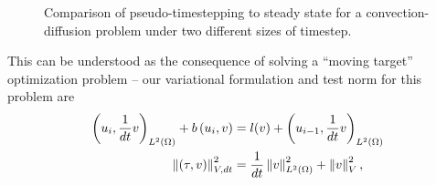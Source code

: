 \begin{figure}
\centering
{}
\caption{Comparison of pseudo-timestepping to steady state for a convection-diffusion problem under two different sizes of timestep.}
\label{fig:dtComparison}
\end{figure}
This can be understood as the consequence of solving a ``moving target'' optimization problem -- our variational formulation and test norm for this problem are
\begin{align*}
\LRp{u_{i}, \frac{1}{dt}v}_{\L} + b\LRp{u_i,v} &= l(v) + \LRp{u_{i-1},\frac{1}{dt}v}_{\L}\\
\nor{\LRp{\tau,v}}_{V,dt}^2 &= \frac{1}{dt}\nor{v}_{\L}^2 + \nor{v}_V^2,
\end{align*}
